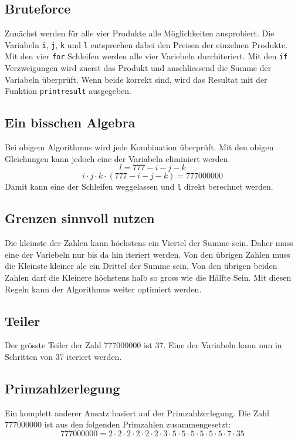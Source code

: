 \documentclass[10pt, fleqn]{article}
\begin{document}
\subsection{Bruteforce}
Zunächst werden für alle vier Produkte alle Möglichkeiten ausprobiert. Die 
Variabeln \verb!i!, \verb!j!, \verb!k! und \verb!l! entsprechen dabei den 
Preisen der einzelnen Produkte. \\
Mit den vier \verb!for! Schleifen werden alle vier Variebeln durchiteriert. 
Mit den \verb!if! Verzweigungen wird zuerst das Produkt und anschliessend die 
Summe der Variabeln überprüft. Wenn beide korrekt sind, wird das Resultat 
mit der Funktion \verb!printresult! ausgegeben. 


\subsection{Ein bisschen Algebra}
Bei obigem Algorithmus wird jede Kombination überprüft. Mit den obigen 
Gleichungen kann jedoch eine der Variabeln eliminiert werden. 
\[ l = 777 - i - j - k \]
\[ i \cdot j \cdot k \cdot (777 - i - j - k) = 777000000 \]
Damit kann eine der Schleifen weggelassen und \verb!l! direkt berechnet werden. 


\subsection{Grenzen sinnvoll nutzen}
Die kleinste der Zahlen kann höchstens ein Viertel der Summe sein. Daher muss 
eine der Variebeln nur bis da hin iteriert werden. Von den übrigen Zahlen muss 
die Kleinste kleiner ale ein Drittel der Summe sein. Von den übrigen beiden 
Zahlen darf die Kleinere höchstens halb so gross wie die Hälfte Sein. Mit 
diesen Regeln kann der Algorithmus weiter optimiert werden. 


\subsection{Teiler}
Der grösste Teiler der Zahl $777000000$ ist $37$. Eine der Variabeln kann nun 
in Schritten von 37 iteriert werden. 


\subsection{Primzahlzerlegung}
Ein komplett anderer Ansatz basiert auf der Primzahlzerlegung. Die Zahl 
$777000000$ ist aus den folgenden Primzahlen zusammengesetzt: 
\[ 777000000 = 2 \cdot 2 \cdot 2 \cdot 2 \cdot 2 \cdot 2 \cdot 3 
\cdot 5 \cdot 5 \cdot 5 \cdot 5 \cdot 5 \cdot 5 \cdot 7 \cdot 35 \]
\end{document}

